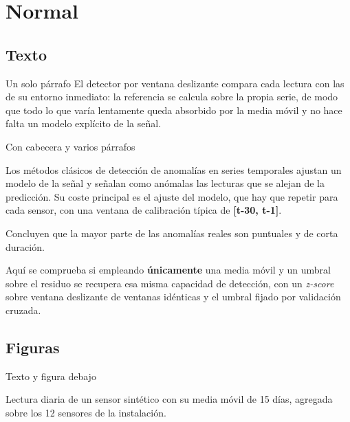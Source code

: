 \documentclass[aspectratio=169,9pt]{beamer}
\begin{document}
\section{Normal}

\subsection{Texto}

\begin{frame}{Un solo párrafo}
  El detector por ventana deslizante compara cada lectura con las de su
  entorno inmediato: la referencia se calcula sobre la propia serie, de modo
  que todo lo que varía lentamente queda absorbido por la media móvil y no
  hace falta un modelo explícito de la señal.
\end{frame}

\begin{frame}{Con cabecera y varios párrafos}

  Los métodos clásicos de detección de anomalías en series temporales
  ajustan un modelo de la señal y señalan como anómalas las lecturas que se
  alejan de la predicción. Su coste principal es el ajuste del modelo, que
  hay que repetir para cada sensor, con una ventana de calibración típica de
  \textbf{[t-30, t-1]}.

  Concluyen que la mayor parte de las anomalías reales son puntuales y de
  corta duración.

  Aquí se comprueba si empleando \textbf{únicamente} una media móvil y un
  umbral sobre el residuo se recupera esa misma capacidad de detección, con
  un \emph{z-score} sobre ventana deslizante de ventanas idénticas y el
  umbral fijado por validación cruzada.
\end{frame}

\subsection{Figuras}

\begin{frame}{Texto y figura debajo}

  Lectura diaria de un sensor sintético con su media móvil de 15 días,
  agregada sobre los 12 sensores de la instalación.

\end{frame}
\end{document}
